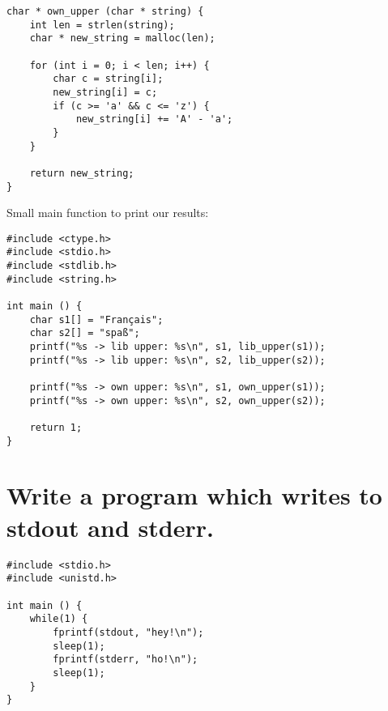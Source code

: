 
\begin{lstlisting}
char * own_upper (char * string) {
    int len = strlen(string);
    char * new_string = malloc(len);

    for (int i = 0; i < len; i++) {
        char c = string[i];
        new_string[i] = c;
        if (c >= 'a' && c <= 'z') {
            new_string[i] += 'A' - 'a';
        }
    }

    return new_string;
}
\end{lstlisting}

Small main function to print our results:
\begin{lstlisting}
#include <ctype.h>
#include <stdio.h>
#include <stdlib.h>
#include <string.h>

int main () {
    char s1[] = "Français";
    char s2[] = "spaß";
    printf("%s -> lib upper: %s\n", s1, lib_upper(s1));
    printf("%s -> lib upper: %s\n", s2, lib_upper(s2));

    printf("%s -> own upper: %s\n", s1, own_upper(s1));
    printf("%s -> own upper: %s\n", s2, own_upper(s2));

    return 1;
}
\end{lstlisting}


%
%
\section{Write a program which writes to stdout and stderr.}


\begin{lstlisting}
#include <stdio.h>
#include <unistd.h>

int main () {
    while(1) {
        fprintf(stdout, "hey!\n");
        sleep(1);
        fprintf(stderr, "ho!\n");
        sleep(1);
    }
}
\end{lstlisting}



